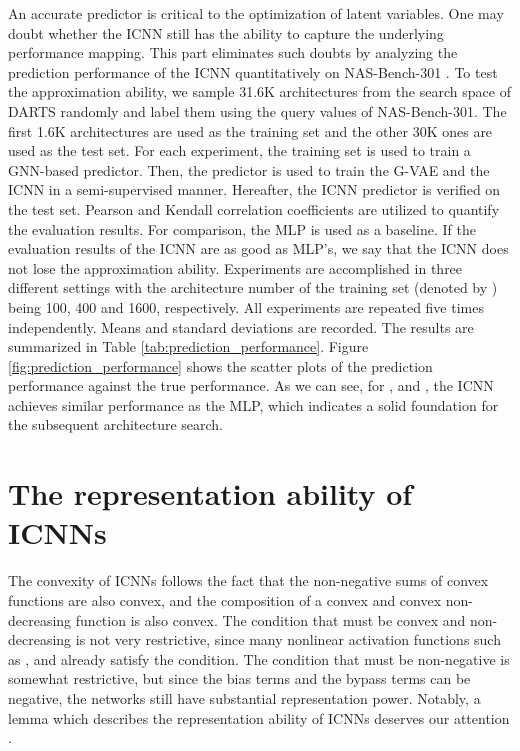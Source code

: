 \documentclass[10pt,twocolumn,letterpaper]{article}
\begin{document}
An accurate predictor is critical to the optimization of latent variables. One may doubt whether the ICNN still has the ability to capture the underlying performance mapping. This part eliminates such doubts by analyzing the prediction performance of the ICNN quantitatively on NAS-Bench-301 \cite{siems2020bench}. To test the approximation ability, we sample 31.6K architectures from the search space of DARTS randomly and label them using the query values of NAS-Bench-301. The first 1.6K architectures are used as the training set and the other 30K ones are used as the test set. For each experiment, the training set is used to train a GNN-based predictor. Then, the predictor is used to train the G-VAE and the ICNN in a semi-supervised manner. Hereafter, the ICNN predictor is verified on the test set. Pearson and Kendall correlation coefficients are utilized to quantify the evaluation results. For comparison, the MLP is used as a baseline. If the evaluation results of the ICNN are as good as MLP's, we say that the ICNN does not lose the approximation ability. Experiments are accomplished in three different settings with the architecture number of the training set (denoted by ) being 100, 400 and 1600, respectively. All experiments are repeated five times independently. Means and standard deviations are recorded. The results are summarized in Table \ref{tab:prediction_performance}. Figure \ref{fig:prediction_performance} shows the scatter plots of the prediction performance against the true performance. As we can see, for ,  and , the ICNN achieves similar performance as the MLP, which indicates a solid foundation for the subsequent architecture search.

\section{The representation ability of ICNNs} 
The convexity of ICNNs follows the fact that the non-negative sums of convex functions are also convex, and the composition of a convex and convex non-decreasing function is also convex. The condition that  must be convex and non-decreasing is not very restrictive, since many nonlinear activation functions such as ,  and  already satisfy the condition. The condition that  must be non-negative is somewhat restrictive, but since the bias terms and the bypass  terms can be negative, the networks still have substantial representation power. Notably, a lemma which describes the representation ability of ICNNs deserves our attention \cite{chen2018optimal}. 
\end{document}
